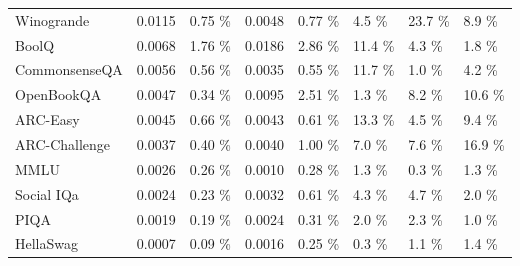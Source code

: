\begin{table}[t]
\begin{tabular}{l | C{33pt} C{33pt} C{33pt} C{33pt} | C{33pt} C{33pt} C{33pt}}
Winogrande & 0.0115 & 0.75 \% & 0.0048 & 0.77 \% & 4.5 \% & 23.7 \% & 8.9 \% \\
BoolQ & 0.0068 & 1.76 \% & 0.0186 & 2.86 \% & 11.4 \% & 4.3 \% & 1.8 \% \\
CommonsenseQA & 0.0056 & 0.56 \% & 0.0035 & 0.55 \% & 11.7 \% & 1.0 \% & 4.2 \% \\
OpenBookQA & 0.0047 & 0.34 \% & 0.0095 & 2.51 \% & 1.3 \% & 8.2 \% & 10.6 \% \\
ARC-Easy & 0.0045 & 0.66 \% & 0.0043 & 0.61 \% & 13.3 \% & 4.5 \% & 9.4 \% \\
ARC-Challenge & 0.0037 & 0.40 \% & 0.0040 & 1.00 \% & 7.0 \% & 7.6 \% & 16.9 \% \\
MMLU & 0.0026 & 0.26 \% & 0.0010 & 0.28 \% & 1.3 \% & 0.3 \% & 1.3 \% \\
Social IQa & 0.0024 & 0.23 \% & 0.0032 & 0.61 \% & 4.3 \% & 4.7 \% & 2.0 \% \\
PIQA & 0.0019 & 0.19 \% & 0.0024 & 0.31 \% & 2.0 \% & 2.3 \% & 1.0 \% \\
HellaSwag & 0.0007 & 0.09 \% & 0.0016 & 0.25 \% & 0.3 \% & 1.1 \% & 1.4 \% \\
\bottomrule
\end{tabular}

\label{tab:variance_analysis}
\vspace{-12pt}
\end{table}

